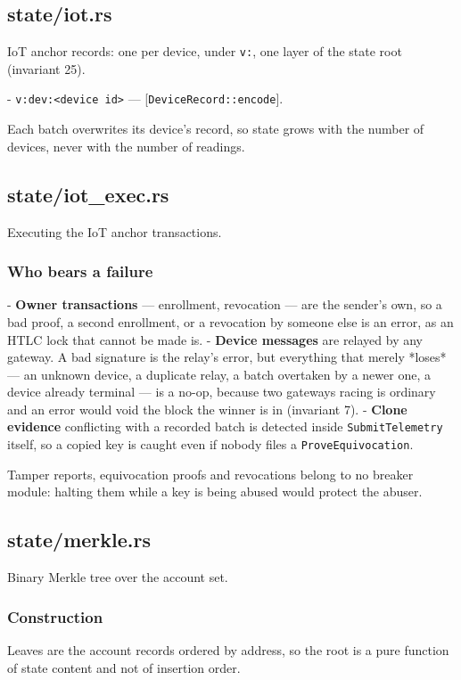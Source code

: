\documentclass[11pt,a4paper]{article}
\begin{document}
\subsection{state/iot.rs}
IoT anchor records: one per device, under \texttt{v:}, one layer of the state root
(invariant 25).

- \texttt{v:dev:<device id>} — [\texttt{DeviceRecord::encode}].

Each batch overwrites its device's record, so state grows with the number
of devices, never with the number of readings.

\subsection{state/iot\_exec.rs}
Executing the IoT anchor transactions.

\subsubsection{Who bears a failure}

- \textbf{Owner transactions} — enrollment, revocation — are the sender's own, so
  a bad proof, a second enrollment, or a revocation by someone else is an
  error, as an HTLC lock that cannot be made is.
- \textbf{Device messages} are relayed by any gateway. A bad signature is the
  relay's error, but everything that merely *loses* — an unknown device, a
  duplicate relay, a batch overtaken by a newer one, a device already
  terminal — is a no-op, because two gateways racing is ordinary and an
  error would void the block the winner is in (invariant 7).
- \textbf{Clone evidence} conflicting with a recorded batch is detected inside
  \texttt{SubmitTelemetry} itself, so a copied key is caught even if nobody files a
  \texttt{ProveEquivocation}.

Tamper reports, equivocation proofs and revocations belong to no breaker
module: halting them while a key is being abused would protect the abuser.

\subsection{state/merkle.rs}
Binary Merkle tree over the account set.

\subsubsection{Construction}

Leaves are the account records ordered by address, so the root is a pure
function of state content and not of insertion order.
\end{document}
